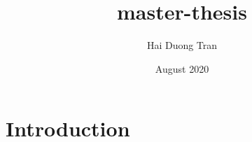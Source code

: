 \documentclass{mimosis}
\title{master-thesis}
\author{Hai Duong Tran}
\date{August 2020}
\begin{document}
\maketitle

\section{Introduction}
\end{document}
